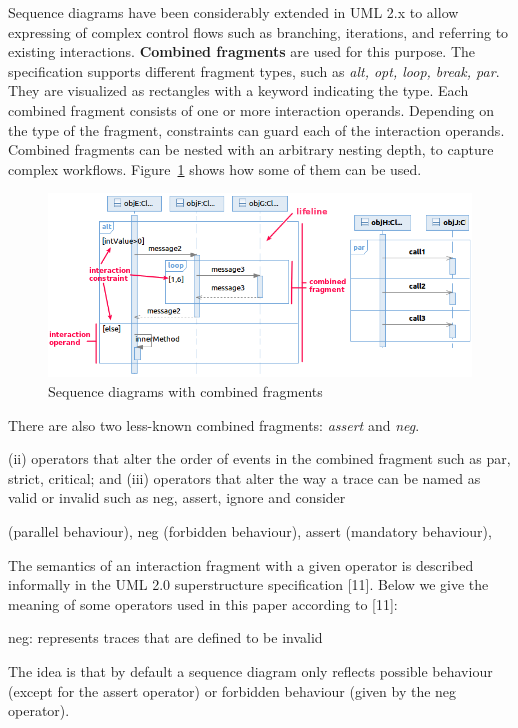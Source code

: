 \documentclass[letter]{llncs}
\begin{document}
Sequence diagrams have been considerably extended in UML 2.x to allow expressing of complex control 
flows such as branching, iterations, and referring to existing interactions.
\textbf{Combined fragments} are used for this purpose. The specification
supports different fragment types, such as \emph{alt, opt, loop, break, par}. They are
visualized as rectangles with a keyword indicating the type.
Each combined fragment consists of one or more interaction operands. Depending
on the type of the fragment, constraints can guard each of the interaction operands. 
Combined fragments can be nested with an arbitrary nesting
depth, to capture complex workflows. Figure~\ref{fig:SDExample} shows how some of them can be
used. 
\begin{figure}[!t]
\centering
\includegraphics[width=1.0\linewidth,keepaspectratio=true]{./Figure2_merged.png}
\caption{Sequence diagrams with combined fragments}
\label{fig:SDExample}
\end{figure}
There are also two less-known combined fragments: \emph{assert} and \emph{neg}.

(ii) operators that
alter the order of events in the combined fragment such as par,
strict, critical; and (iii) operators that alter the way a trace can be
named as valid or invalid such as neg, assert, ignore and consider

(parallel behaviour), neg (forbidden behaviour), assert (mandatory behaviour),

The semantics of an
interaction fragment with a given operator is described informally in the UML
2.0 superstructure specification [11]. Below we give the meaning of some
operators used in this paper according to [11]:

neg: represents traces that are defined to be invalid

The idea is that by default a sequence diagram only reflects possible behaviour
(except for the assert operator) or forbidden behaviour (given by the neg
operator).  
\end{document}
